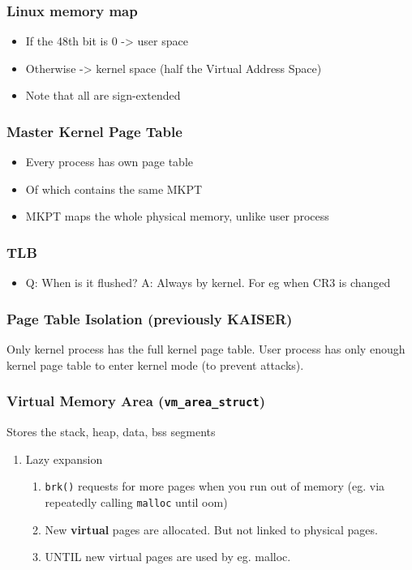 \documentclass[11pt]{article}
\begin{document}
\subsubsection{Linux memory map}
\label{sec:org72fe617}
\begin{itemize}
\item If the 48th bit is 0 -> user space
\item Otherwise -> kernel space (half the Virtual Address Space)
\item Note that all are sign-extended
\end{itemize}
\subsubsection{Master Kernel Page Table}
\label{sec:org35d546a}
\begin{itemize}
\item Every process has own page table
\item Of which contains the same MKPT
\item MKPT maps the whole physical memory, unlike user process
\end{itemize}
\subsubsection{TLB}
\label{sec:org1b043ec}
\begin{itemize}
\item Q: When is it flushed?
A: Always by kernel. For eg when CR3 is changed
\end{itemize}
\subsubsection{Page Table Isolation (previously KAISER)}
\label{sec:orgf48b64c}
Only kernel process has the full kernel page table.
User process has only enough kernel page table to enter kernel mode (to prevent attacks).
\subsubsection{Virtual Memory Area (\texttt{vm\_area\_struct})}
\label{sec:orga664f87}
Stores the stack, heap, data, bss segments
\begin{enumerate}
\item Lazy expansion
\label{sec:org00885c2}
\begin{enumerate}
\item \texttt{brk()} requests for more pages when you run out of memory (eg. via
repeatedly calling \texttt{malloc} until oom)
\item New \textbf{virtual} pages are allocated. But not linked to physical pages.
\item UNTIL new virtual pages are used by eg. malloc.
\end{enumerate}
\end{enumerate}
\end{document}

